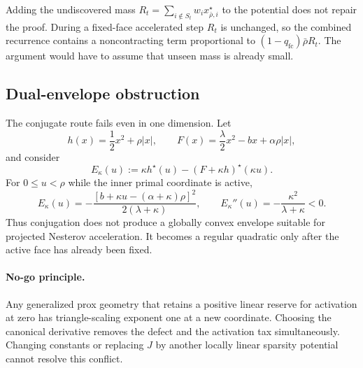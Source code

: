 Adding the undiscovered mass
$R_t=\sum_{i\notin S_t}w_i x_{\bar\rho,i}^\star$ to the potential does not
repair the proof.  During a fixed-face accelerated step $R_t$ is unchanged,
so the combined recurrence contains a noncontracting term proportional to
$(1-q_{\mathrm{fc}})\bar\rho R_t$. The argument would have to assume that
unseen mass is
already small.

\subsection{Dual-envelope obstruction}

The conjugate route fails even in one dimension.  Let
\[
 h(x)=\frac12x^2+\rho|x|,
 \qquad
 F(x)=\frac\lambda2x^2-bx+\alpha\rho|x|,
\]
and consider
\[
 E_\kappa(u)
 :=\kappa h^\star(u)-(F+\kappa h)^\star(\kappa u).
\]
For $0\le u<\rho$ while the inner primal coordinate is active,
\[
 E_\kappa(u)
 =-\frac{[b+\kappa u-(\alpha+\kappa)\rho]^2}
         {2(\lambda+\kappa)},
 \qquad
 E_\kappa''(u)=-\frac{\kappa^2}{\lambda+\kappa}<0.
\]
Thus conjugation does not produce a globally convex envelope suitable for
projected Nesterov acceleration.  It becomes a regular quadratic only after
the active face has already been fixed.

\paragraph{No-go principle.}
Any generalized prox geometry that retains a positive linear reserve for
activation at zero has triangle-scaling exponent one at a new coordinate.
Choosing the canonical derivative removes the defect and the activation tax
simultaneously.  Changing constants or replacing $J$ by another locally
linear sparsity potential cannot resolve this conflict.
